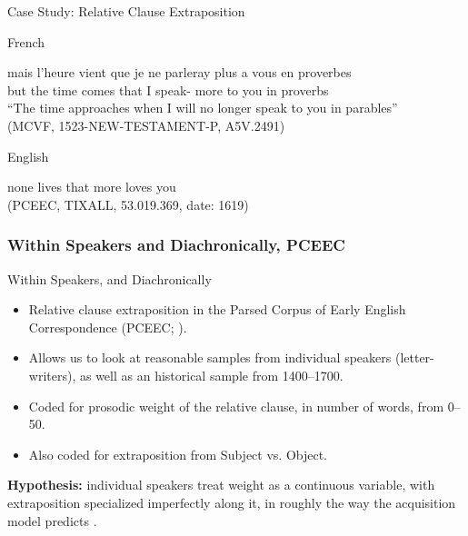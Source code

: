 \documentclass[hyperref={pdfpagelabels=false}]{beamer}
\begin{document}
\begin{frame}{Case Study: Relative Clause Extraposition}

	\begin{block}{French}
		\begin{exe}
			\ex \gll mais l'heure vient que je ne parleray plus a vous en proverbes\\
			but {the time} comes that I  speak- more to you in proverbs\\
			\quad ``The time approaches when I will no longer speak to you in parables''\\
			(MCVF, 1523-NEW-TESTAMENT-P, A5V.2491)
		\end{exe}
	\end{block}
	
	\begin{block}{English}
		\begin{exe}
			\ex none lives that more loves you\\
			(PCEEC, TIXALL, 53.019.369, date: 1619)
		\end{exe}
	\end{block}


\end{frame}


\subsubsection{Within Speakers and Diachronically, PCEEC}

\begin{frame}{Within Speakers, and Diachronically}
\begin{itemize}
	\item Relative clause extraposition in the Parsed Corpus of Early English Correspondence  (PCEEC; \citealt{pceec}).
	\item Allows us to look at reasonable samples from individual speakers (letter-writers), as well as an historical sample from 1400--1700.
	\item Coded for prosodic weight of the relative clause, in number of words, from 0--50.
	\item Also coded for extraposition from Subject vs. Object.
\end{itemize}
	\textbf{Hypothesis:} individual speakers treat weight as a continuous variable, with extraposition specialized imperfectly along it, in roughly the way the acquisition model predicts \citep[following on][]{antonmackenzie2011a}.

\end{frame}
\end{document}
